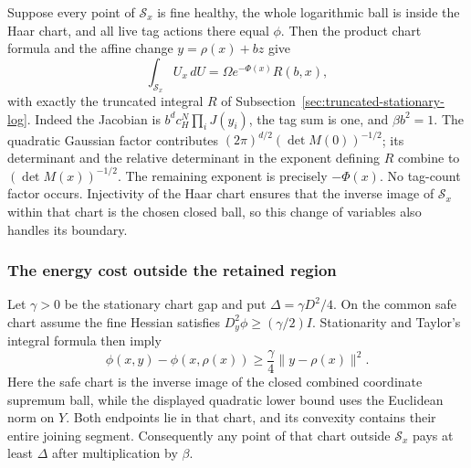 Suppose every point of $\mathcal S_x$ is fine healthy, the whole
logarithmic ball is inside the Haar chart, and all live tag actions
there equal $\phi$. Then the product chart formula and the affine
change $y=\rho(x)+bz$ give
\begin{equation}\label{eq:exterior-exact-interior}
       \int_{\mathcal S_x}U_x\,dU
                  =\Omega e^{-\Phi(x)}R(b,x),
\end{equation}
with exactly the truncated integral $R$ of
Subsection~\ref{sec:truncated-stationary-log}.
Indeed the Jacobian is $b^dc_H^N\prod_iJ(y_i)$, the tag sum is
one, and $\beta b^2=1$. The quadratic Gaussian factor contributes
$(2\pi)^{d/2}(\det M(0))^{-1/2}$; its determinant and the relative
determinant in the exponent defining $R$ combine to
$(\det M(x))^{-1/2}$. The remaining exponent is precisely
$-\Phi(x)$. No tag-count factor occurs. Injectivity of the Haar
chart ensures that the inverse image of $\mathcal S_x$ within that
chart is the chosen closed ball, so this change of variables also
handles its boundary.

\subsubsection{The energy cost outside the retained region}
Let $\gamma>0$ be the stationary chart gap and put
$\Delta=\gamma D^2/4$. On the common safe chart assume the fine
Hessian satisfies $D_y^2\phi\ge(\gamma/2)I$.
Stationarity and Taylor's integral formula then imply
\begin{equation}\label{eq:exterior-convex-gap}
 \phi(x,y)-\phi(x,\rho(x))
          \ge\frac\gamma4\|y-\rho(x)\|^2.
\end{equation}
Here the safe chart is the inverse image of the closed combined
coordinate supremum ball, while the displayed quadratic lower
bound uses the Euclidean norm on $Y$. Both endpoints lie in that
chart, and its convexity contains their entire joining segment.
Consequently any point of that chart outside $\mathcal S_x$ pays
at least $\Delta$ after multiplication by $\beta$.


